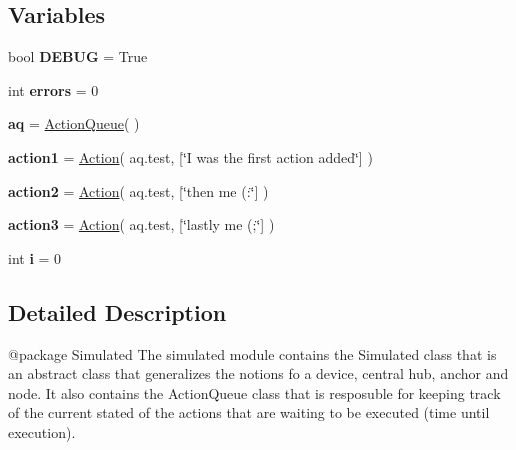 \subsection*{Variables}
\begin{DoxyCompactItemize}
\item 
\mbox{\label{namespacesimlib_1_1simulated_a869c9cd35f4300c21611c3493a502d2b}} 
bool {\bfseries D\+E\+B\+UG} = True
\item 
\mbox{\label{namespacesimlib_1_1simulated_a61b1e354d4de5ca84c3ef59b995f1d94}} 
int {\bfseries errors} = 0
\item 
\mbox{\label{namespacesimlib_1_1simulated_a568d0a51b773f62750b4f5f3be304e06}} 
{\bfseries aq} = \mbox{\hyperlink{classsimlib_1_1simulated_1_1_action_queue}{Action\+Queue}}( )
\item 
\mbox{\label{namespacesimlib_1_1simulated_a2824112ce8253f4840a2f4e50bf6d08d}} 
{\bfseries action1} = \mbox{\hyperlink{classsimlib_1_1action_1_1_action}{Action}}( aq.\+test, \mbox{[}\char`\"{}I was the first action added\char`\"{}\mbox{]} )
\item 
\mbox{\label{namespacesimlib_1_1simulated_a89b7aff90a7c400753f78d0544a57f9a}} 
{\bfseries action2} = \mbox{\hyperlink{classsimlib_1_1action_1_1_action}{Action}}( aq.\+test, \mbox{[}\char`\"{}then me (\+:\char`\"{}\mbox{]} )
\item 
\mbox{\label{namespacesimlib_1_1simulated_accf462e21b425ff2fa68976fc5524bca}} 
{\bfseries action3} = \mbox{\hyperlink{classsimlib_1_1action_1_1_action}{Action}}( aq.\+test, \mbox{[}\char`\"{}lastly me (;\char`\"{}\mbox{]} )
\item 
\mbox{\label{namespacesimlib_1_1simulated_a043c73724dd23fd70be661f0357bb1cf}} 
int {\bfseries i} = 0
\end{DoxyCompactItemize}


\subsection{Detailed Description}
\begin{DoxyVerb}@package Simulated 
The simulated module contains the Simulated class that is an abstract class
that generalizes the notions fo a device, central hub, anchor and node. It 
also contains the ActionQueue class that is resposuble for keeping track of
the current stated of the actions that are waiting to be executed (time until
execution).
\end{DoxyVerb}
 